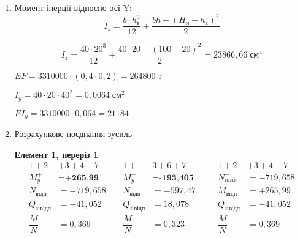 \documentclass[a4paper,14pt]{article}
\begin{document}
\begin{enumerate}
    \item Момент інерції відносно осі Y:
    \begin{equation}
        I_z = \frac{b\cdot h^3_\textit{в}}{12}+\frac{bh-(H_\textit{н}-h_\textit{в})^2}{2} 
    \end{equation}
    
    $$I_z = \frac{40\cdot 20^3}{12}+\frac{40\cdot 20-(100-20)^2}{2}=23866,66\;\textit{см}^4$$

    $EF=3310000\cdot (0,4\cdot 0,2) = 264800\;\textit{т}$

    $I_y = 40 \cdot 20\cdot 40^2 = 0,0064\;\textit{см}^2$

    $EI_y = 3310000\cdot 0,064 = 21184$

    \item Розрахункове поєднання зусиль
    
    \textbf{Елемент 1, переріз 1}
    \begin{equation*}
        \begin{aligned}
        1+2&+3+4-7\qquad  &1+&3+6+7 &1+2&+3+4-7\\
        M^+_y &= \textbf{+265,99} &M^-_y &= \textbf{-193,405}\qquad &N^-_{max} &= -719,658\\
        N_\textit{відп} &= -719,658  &N_\textit{відп} &= -597,47 &M_\textit{відп} &= +265,99 \\
        Q_\textit{z.відп} &= -41,052 &Q_\textit{z.відп} &= 18,078 &Q_\textit{z.відп} &= -41,052 \\
        \dfrac{M}{N}&=0,369  &\dfrac{M}{N}&=0,323 &\dfrac{M}{N}&=0,369 
        \end{aligned}
    \end{equation*}
 

\end{enumerate}
\end{document}
